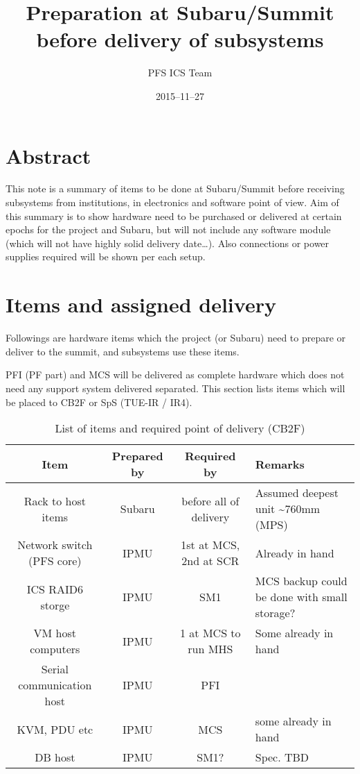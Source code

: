 \documentclass[a4paper,notitlepage]{article}
\title{Preparation at Subaru/Summit before delivery of subsystems}
\author{PFS ICS Team}
\date{2015--11--27}
\begin{document}

\ssnhead

\section{Abstract}

This note is a summary of items to be done at Subaru/Summit before receiving 
subsystems from institutions, in electronics and software point of view. 
Aim of this summary is to show hardware need to be purchased or delivered 
at certain epochs for the project and Subaru, but will not include any 
software module (which will not have highly solid delivery date…). 
Also connections or power supplies required will be shown per each setup. 


\section{Items and assigned delivery}

Followings are hardware items which the project (or Subaru) need to prepare 
or deliver to the summit, and subsystems use these items.

PFI (PF part) and MCS will be delivered as complete hardware which does not 
need any support system delivered separated. This section lists items which 
will be placed to CB2F or SpS (TUE-IR / IR4). 

\begin{table}[htb]
\caption{List of items and required point of delivery (CB2F)}
\label{tbl:listitem-cb2f}
\begin{center}
\begin{tabular}{c||c|c|l}
Item & Prepared by & Required by & Remarks \\
\hline
Rack to host items & Subaru & before all of delivery & Assumed deepest unit 
  \~{}760mm (MPS) \\
Network switch (PFS core) & IPMU & 1st at MCS, 2nd at SCR & Already in hand \\
ICS RAID6 storge & IPMU & SM1 & MCS backup could be done with small storage? \\
VM host computers & IPMU & 1 at MCS to run MHS & Some already in hand \\
Serial communication host & IPMU & PFI & \\
KVM, PDU etc & IPMU & MCS & some already in hand \\
DB host & IPMU & SM1? & Spec. TBD 
\end{tabular}
\end{center}
\end{table}
\end{document}
